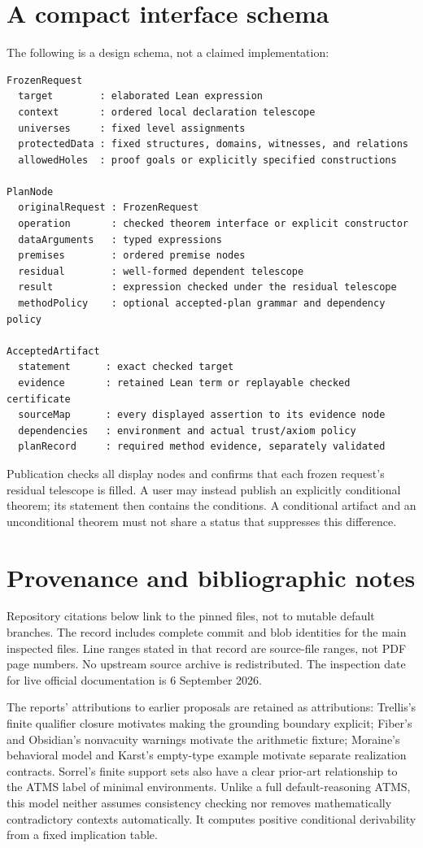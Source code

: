 \documentclass[11pt,a4paper]{article}
\newcommand{\code}[1]{\texttt{\detokenize{#1}}}
\numberwithin{equation}{section}
\theoremstyle{definition}\newtheorem{definition}[theorem]{Definition}
\theoremstyle{remark}\newtheorem{remark}[theorem]{Remark}
\begin{document}
\section{A compact interface schema}\label{app:schema}
The following is a design schema, not a claimed implementation:
\begin{lstlisting}
FrozenRequest
  target        : elaborated Lean expression
  context       : ordered local declaration telescope
  universes     : fixed level assignments
  protectedData : fixed structures, domains, witnesses, and relations
  allowedHoles  : proof goals or explicitly specified constructions

PlanNode
  originalRequest : FrozenRequest
  operation       : checked theorem interface or explicit constructor
  dataArguments   : typed expressions
  premises        : ordered premise nodes
  residual        : well-formed dependent telescope
  result          : expression checked under the residual telescope
  methodPolicy    : optional accepted-plan grammar and dependency policy

AcceptedArtifact
  statement      : exact checked target
  evidence       : retained Lean term or replayable checked certificate
  sourceMap      : every displayed assertion to its evidence node
  dependencies   : environment and actual trust/axiom policy
  planRecord     : required method evidence, separately validated
\end{lstlisting}

Publication checks all display nodes and confirms that each frozen request's
residual telescope is filled. A user may instead publish an explicitly
conditional theorem; its statement then contains the conditions. A conditional
artifact and an unconditional theorem must not share a status that suppresses
this difference.

\section{Provenance and bibliographic notes}\label{app:sources}
Repository citations below link to the pinned files, not to mutable default
branches. The record \code{sources.json} includes complete commit and blob
identities for the main inspected files. Line ranges stated in that record
are source-file ranges, not PDF page numbers. No upstream source archive is
redistributed. The inspection date for live official documentation is
6 September 2026.

The reports' attributions to earlier proposals are retained as attributions:
Trellis's finite qualifier closure motivates making the grounding boundary
explicit; Fiber's and Obsidian's nonvacuity warnings motivate the arithmetic
fixture; Moraine's behavioral model and Karst's empty-type example motivate
separate realization contracts. Sorrel's finite support sets also have a clear
prior-art relationship to the ATMS label of minimal environments. Unlike a
full default-reasoning ATMS, this model neither assumes consistency checking
nor removes mathematically contradictory contexts automatically. It computes
positive conditional derivability from a fixed implication table.
\end{document}
